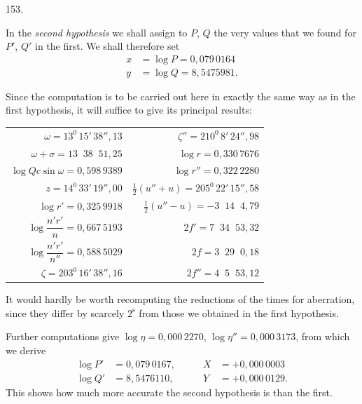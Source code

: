 \par{}\medskip
\hypertarget{native-207-article153}{}
\begin{center}153.\end{center}
In the \textit{second hypothesis} we shall assign to $P$, $Q$ the very values that we found for $P'$, $Q'$ in the first. We shall therefore set
\[
\begin{aligned}
x&=\log P=0{,}079\,0164\\
y&=\log Q=8{,}5475981.
\end{aligned}
\]

Since the computation is to be carried out here in exactly the same way as in the first hypothesis, it will suffice to give its principal results:
\begin{center}
\small
\setlength{\tabcolsep}{6pt}
\begin{tabular}{@{}r|r@{}}
$\omega=13^0\,15'\,38''{,}13$ & $\zeta''=210^0\,8'\,24''{,}98$\\[.5em]
$\omega+\sigma=13\;\;38\;\;51{,}25$ & $\log r=0{,}330\,7676$\\[.5em]
$\log Qc\sin\omega=0{,}598\,9389$ & $\log r''=0{,}322\,2280$\\[.5em]
$z=14^0\,33'\,19''{,}00$ & $\tfrac12(u''+u)=205^0\,22'\,15''{,}58$\\[.5em]
$\log r'=0{,}325\,9918$ & $\tfrac12(u''-u)=-3\;\;14\;\;4{,}79$\\[.7em]
$\log\dfrac{n'r'}{n}=0{,}667\,5193$ & $2f'=7\;\;34\;\;53{,}32$\\[.7em]
$\log\dfrac{n'r'}{n''}=0{,}588\,5029$ & $2f=3\;\;29\;\;0{,}18$\\[.5em]
$\zeta=203^0\,16'\,38''{,}16$ & $2f''=4\;\;5\;\;53{,}12$
\end{tabular}
\end{center}

It would hardly be worth recomputing the reductions of the times for aberration, since they differ by scarcely $2^{\mathrm{s}}$ from those we obtained in the first hypothesis.

Further computations give $\log\eta=0{,}000\,2270$, $\log\eta''=0{,}000\,3173$, from which we derive
\[
\begin{aligned}
\log P'&=0{,}079\,0167,&\qquad X&=+0{,}000\,0003\\
\log Q'&=8{,}5476110,&\qquad Y&=+0{,}000\,0129.
\end{aligned}
\]
This shows how much more accurate the second hypothesis is than the first.

